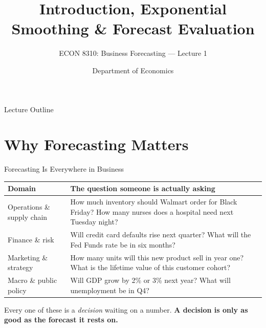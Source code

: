 \documentclass[aspectratio=169, 11pt]{beamer}
\title[Intro, ETS \& Evaluation]{Introduction, Exponential Smoothing \& Forecast Evaluation}
\subtitle{ECON 8310: Business Forecasting --- Lecture 1}
\author{Department of Economics}
\institute{University of Nebraska at Omaha}
\begin{document}

\begin{frame}
  \titlepage
\end{frame}

\begin{frame}{Lecture Outline}
  \tableofcontents
\end{frame}

\section{Why Forecasting Matters}


\begin{frame}{Forecasting Is Everywhere in Business}
  \begin{center}
    {\small
    \begin{tabular}{p{3.3cm}p{9.6cm}}
      \toprule
      \textbf{Domain} & \textbf{The question someone is actually asking} \\
      \midrule
      Operations \& supply chain
        & How much inventory should Walmart order for Black Friday?
          How many nurses does a hospital need next Tuesday night? \\[2pt]
      Finance \& risk
        & Will credit card defaults rise next quarter?
          What will the Fed Funds rate be in six months? \\[2pt]
      Marketing \& strategy
        & How many units will this new product sell in year one?
          What is the lifetime value of this customer cohort? \\[2pt]
      Macro \& public policy
        & Will GDP grow by 2\% or 3\% next year?
          What will unemployment be in Q4? \\
      \bottomrule
    \end{tabular}
    }
  \end{center}
  \vspace{0.2cm}
  Every one of these is a \emph{decision} waiting on a number.
  \textbf{A decision is only as good as the forecast it rests on.}
\end{frame}
\end{document}
